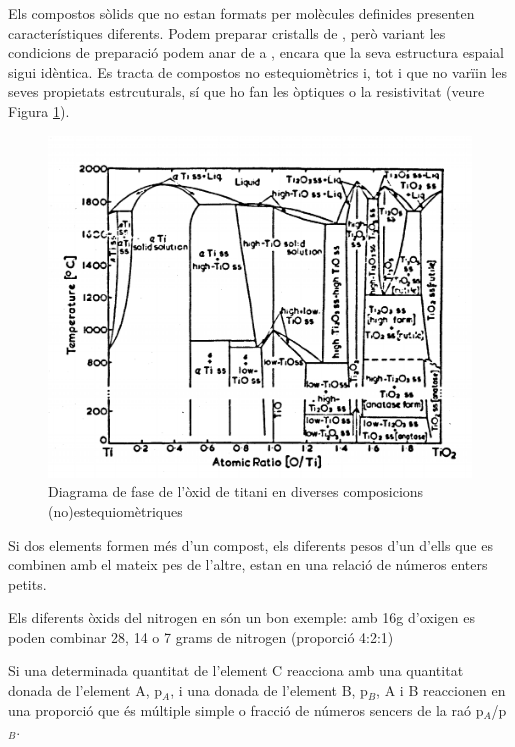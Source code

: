 Els compostos sòlids que no estan formats per molècules definides presenten característiques diferents. Podem preparar cristalls de , però variant les condicions de preparació podem anar de  a , encara que la seva estructura espaial sigui idèntica. Es tracta de compostos no estequiomètrics i, tot i que no varïin les seves propietats estrcuturals, sí que ho fan les òptiques o la resistivitat (veure Figura \ref{fig:TiOPhaseDiagram}).
\begin{figure}[h]
\centering
\includegraphics[scale=0.35]{figures/TiOPhaseDiagram.png}
\caption{Diagrama de fase de l'òxid de titani en diverses composicions (no)estequiomètriques\cite{DeVries1954}}
\label{fig:TiOPhaseDiagram}
\end{figure}

\begin{mdframed}[backgroundcolor=gray!30,frametitle=Llei de les proporcions múltiples]
Si dos elements formen més d'un compost, els diferents pesos d'un d'ells que es combinen amb el mateix pes de l'altre, estan en una relació de números enters petits.
\end{mdframed}

Els diferents òxids del nitrogen en són un bon exemple: amb 16g d'oxigen es poden combinar 28, 14 o 7 grams de nitrogen (proporció 4:2:1)

\begin{mdframed}[backgroundcolor=gray!30,frametitle=Llei de les proporcions equivalents]
Si una determinada quantitat de l'element C reacciona amb una quantitat donada de l'element A, p$_A$, i una donada de l'element B, p$_B$, A i B reaccionen en una proporció que és múltiple simple o fracció de números sencers de la raó p$_A$/p$_B$.
\end{mdframed}

